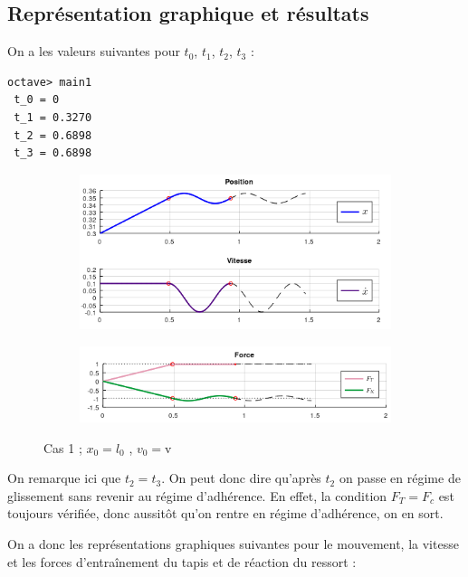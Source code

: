 \documentclass{article}
\newcommand{\ts}{\scriptscriptstyle}
\begin{document}
\subsection{Représentation graphique et résultats}
On a les valeurs suivantes pour $t_0$, $t_1$, $t_2$, $t_3$ :
\begin{lstlisting}
octave> main1
 t_0 = 0
 t_1 = 0.3270
 t_2 = 0.6898
 t_3 = 0.6898
\end{lstlisting}

\begin{figure}[h!]
  \centering
  \hspace{-2cm}
  \begin{subfigure}[b]{.45\linewidth}
    \includegraphics[width=1.3\linewidth]{Cas1a.png}
  \end{subfigure}
  \hspace{2cm}
  \begin{subfigure}[b]{.45\linewidth}
    \includegraphics[width=1.3\linewidth]{CAS1b.png}
  \end{subfigure}
  \caption{Cas 1 ; $x_0 = l_0$ , $v_0 = \text{v}$}
\end{figure}

On remarque ici que $t_2 = t_3$. On peut donc dire qu'après $t_2$ on passe en régime de glissement sans revenir au régime d'adhérence. En effet, la condition $F_{\ts{T}} = F_c$ est toujours vérifiée, donc aussitôt qu'on rentre en régime d'adhérence, on en sort.

On a donc les représentations graphiques suivantes pour le mouvement, la vitesse et les forces d'entraînement du tapis et de réaction du ressort : 
\end{document}

